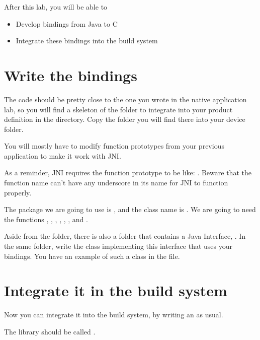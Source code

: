 
After this lab, you will be able to
\begin{itemize}
  \item Develop bindings from Java to C
  \item Integrate these bindings into the build system
\end{itemize}

\section{Write the bindings}

The code should be pretty close to the one you wrote in the native
application lab, so you will find a skeleton of the folder to
integrate into your product definition in the
 directory. Copy the 
folder you will find there into your device folder.

You will mostly have to modify function prototypes from your previous
application to make it work with JNI.

As a reminder, JNI requires the function prototype to be like:
.
Beware that the function name can't have any underscore in its name
for JNI to function properly.

The package we are going to use is , and
the class name is . We are going to need the
functions , , , ,
, ,  and .

Aside from the  folder, there is also a  folder
that contains a Java Interface, . In the same
folder, write the  class implementing this interface
that uses your bindings. You have an example of such a class in the
 file.

\section{Integrate it in the build system}

Now you can integrate it into the build system, by writing an
 as usual.

The library should be called .

